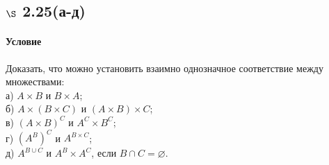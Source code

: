\documentclass[a4paper,12pt]{article}
\begin{document}
\subsection*{$\S$ 2.25(а-д)}
\paragraph*{Условие}
Доказать, что можно установить взаимно однозначное соответствие между множествами:\\
а) $A\times B$ и $B\times A$;\\
б) $A\times (B\times C)$ и $(A\times B)\times C$;\\
в) $(A\times B)^C$ и $A^C\times B^C$;\\
г) $(A^B)^C$ и $A^{B\times C}$;\\
д) $A^{B\cup C}$ и $A^B\times A^C$, если $B\cap C = \varnothing$.
\end{document}
